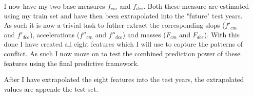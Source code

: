 \documentclass[a4paper]{article}
\begin{document}
I now have my two base measures $f_{cm}$ and $f_{dce}$. Both these measure are estimated using my train set and have then been extrapolated into the "future" test years. As such it is now a trivial task to futher extract the corresponding slops ($f'_{cm}$ and $f'_{dce}$), accelerations ($f''_{cm}$ and $f''_{dce}$) and masses ($F_{cm}$ and $F_{dce}$). With this done I have created all eight features which I will use to capture the patterns of conflict. As such I now move on to test the combined prediction power of these features using the final predictive framework.\par

After I have extrapolated the eight features into the test years, the extrapolated values are appende the test set.










\end{document}
